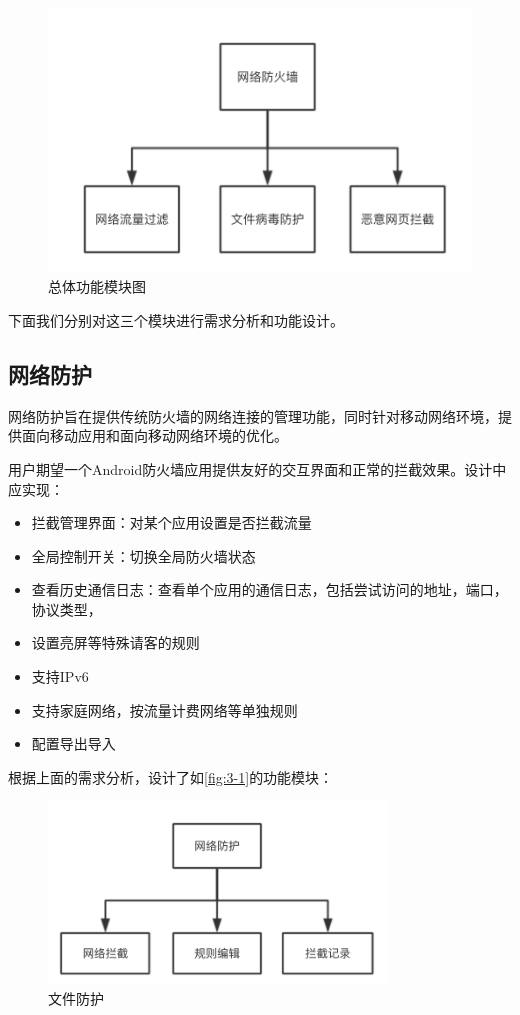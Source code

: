 \documentclass[format=final, language=chinese, degree=fyp]{hustthesis}
\begin{document}
\begin{figure}[!h]
\centering
\includegraphics[width=1\textwidth]{function_all.png}
\caption{总体功能模块图}\label{fig:3-0}
\end{figure}


下面我们分别对这三个模块进行需求分析和功能设计。

\subsection{网络防护}

网络防护旨在提供传统防火墙的网络连接的管理功能，同时针对移动网络环境，提供面向移动应用和面向移动网络环境的优化。

用户期望一个Android防火墙应用提供友好的交互界面和正常的拦截效果。设计中应实现：
\begin{itemize}
    \item 拦截管理界面：对某个应用设置是否拦截流量
    \item 全局控制开关：切换全局防火墙状态
    \item 查看历史通信日志：查看单个应用的通信日志，包括尝试访问的地址，端口，协议类型，
    \item 设置亮屏等特殊请客的规则
    \item 支持IPv6
    \item 支持家庭网络，按流量计费网络等单独规则
    \item 配置导出导入
\end{itemize}

根据上面的需求分析，设计了如\autoref{fig:3-1}的功能模块：
\begin{figure}[!h]
	\centering
	\includegraphics[width=0.8\textwidth]{function_1.png}
	\caption{文件防护}\label{fig:3-1}
\end{figure}
\end{document}
